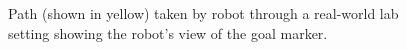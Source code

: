 				\begin{figure}[!h]
					\centering
					\caption{Path (shown in yellow) taken by robot through a real-world lab setting showing the robot's view of the goal marker.}
					\label{fig::potential_field_results_real}
				\end{figure}

